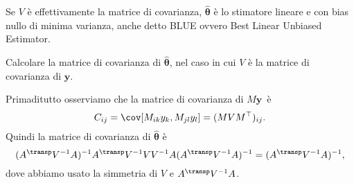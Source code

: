 \begin{fact}
	Se $V$ è effettivamente la matrice di covarianza,
	$\hat{\boldsymbol\theta}$ è lo stimatore lineare e con bias nullo di minima varianza, anche detto BLUE ovvero Best Linear Unbiased Estimator.
\end{fact}

\begin{exercise}
    Calcolare la matrice di covarianza di $\hat{\boldsymbol\theta}$, nel
    caso in cui $V$ è la matrice di covarianza di $\mathbf y$.
\end{exercise}

\begin{solution}
    Primaditutto osserviamo che la matrice di covarianza di $M\mathbf y$~è
    \begin{equation*}
        C_{ij} = \cov[M_{ik} y_k, M_{jl} y_l] = (MVM^\top)_{ij}.
    \end{equation*}
    Quindi la matrice di covarianza di $\hat{\boldsymbol\theta}$ è
    \begin{equation*}
        (A^\transp V^{-1} A)^{-1} A^\transp V^{-1} V
        V^{-1} A (A^\transp V^{-1} A)^{-1}
        = (A^\transp V^{-1} A)^{-1},
    \end{equation*}
    dove abbiamo usato la simmetria di $V$ e $A^\transp V^{-1} A$.
\end{solution}
